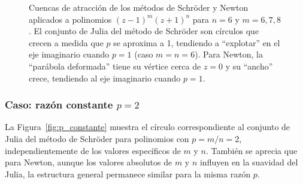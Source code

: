 \begin{figure}[H]
\caption{Cuencas de atracción de los métodos de Schröder y Newton aplicados a polinomios $(z-1)^m(z+1)^n$ para $n=6$ y $m=6, 7, 8$. El conjunto de Julia del método de Schröder son círculos que crecen a medida que $p$ se aproxima a 1, tendiendo a ``explotar'' en el eje imaginario cuando $p=1$ (caso $m=n=6$). Para Newton, la ``parábola deformada'' tiene su vértice cerca de $z=0$ y su ``ancho'' crece, tendiendo al eje imaginario cuando $p=1$.}
\label{fig:p_proximo1}
\end{figure}

\subsubsection{Caso: razón constante $p=2$}

La Figura~\ref{fig:p_constante} muestra el círculo correspondiente al conjunto de Julia del método de Schröder para polinomios con $p=m/n=2$, independientemente de los valores específicos de $m$ y $n$. También se aprecia que para Newton, aunque los valores absolutos de $m$ y $n$ influyen en la suavidad del Julia, la estructura general permanece similar para la misma razón $p$.


